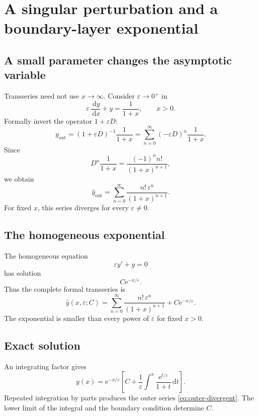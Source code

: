 \documentclass[11pt,oneside]{book}
\theoremstyle{definition}
\theoremstyle{remark}
\newcommand{\e}{\mathrm{e}}
\newcommand{\dd}{\,\mathrm{d}}
\newcommand{\eps}{\varepsilon}
\begin{document}
\chapter{A singular perturbation and a boundary-layer exponential}
\label{ch:singular-perturbation}

\section{A small parameter changes the asymptotic variable}

Transseries need not use $x\to\infty$. Consider $\eps\to0^+$ in
\begin{equation}
  \eps\,\frac{\dd y}{\dd x}+y=\frac1{1+x},
  \qquad x>0.
  \label{eq:singular-perturbation}
\end{equation}
Formally invert the operator $1+\eps D$:
\[
  y_{\mathrm{out}}
  =(1+\eps D)^{-1}\frac1{1+x}
  =\sum_{n=0}^{\infty}(-\eps D)^n\frac1{1+x}.
\]
Since
\[
  D^n\frac1{1+x}=\frac{(-1)^n n!}{(1+x)^{n+1}},
\]
we obtain
\begin{equation}
  \widehat y_{\mathrm{out}}
  =\sum_{n=0}^{\infty}
    \frac{n!\,\eps^n}{(1+x)^{n+1}}.
  \label{eq:outer-divergent}
\end{equation}
For fixed $x$, this series diverges for every $\eps\ne0$.

\section{The homogeneous exponential}

The homogeneous equation
\[
  \eps y'+y=0
\]
has solution
\[
  C\e^{-x/\eps}.
\]
Thus the complete formal transseries is
\begin{equation}
  \widehat y(x,\eps;C)
  =\sum_{n=0}^{\infty}
    \frac{n!\,\eps^n}{(1+x)^{n+1}}
   +C\e^{-x/\eps}.
  \label{eq:singular-complete-transseries}
\end{equation}
The exponential is smaller than every power of $\eps$ for fixed $x>0$.

\section{Exact solution}

An integrating factor gives
\begin{equation}
  y(x)=\e^{-x/\eps}
  \left[
    C+\frac1\eps\int^x
      \frac{\e^{t/\eps}}{1+t}\dd t
  \right].
  \label{eq:singular-exact}
\end{equation}
Repeated integration by parts produces the outer series
\eqref{eq:outer-divergent}. The lower limit of the integral and the boundary
condition determine $C$.
\end{document}
